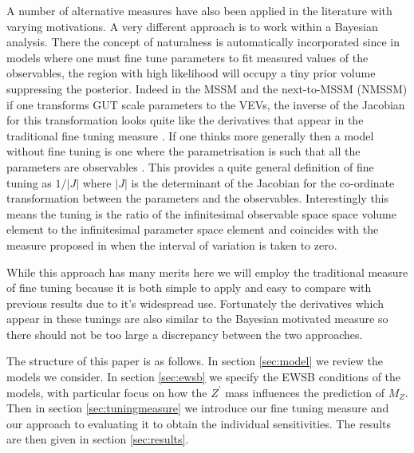 \documentclass[preprint,amsmath,amssymb,aps,superscriptaddress,prd,
showpacs,floatfix,nofootinbib]{revtex4-1}
\begin{document}
A number of alternative measures have also been applied in the
literature \cite{Anderson:1994dz, Anderson:1994tr, Anderson:1995cp,
Anderson:1996ew, Ciafaloni:1996zh, Chan:1997bi, Barbieri:1998uv,
Giusti:1998gz, Casas:2003jx, Casas:2004uu, Casas:2004gh,
Casas:2006bd, Kitano:2005wc, Athron:2007ry, Athron:2007qr,
Baer:2012up} with varying motivations.  A very different approach is
to work within a Bayesian analysis.  There the concept of naturalness
is automatically incorporated since in models where one must fine tune
parameters to fit measured values of the observables, the region with
high likelihood will occupy a tiny prior volume \cite{Allanach:2007qk,
Cabrera:2008tj, Ghilencea:2012gz, Ghilencea:2012qk, Fichet:2012sn,
Kim:2013uxa} suppressing the posterior.  Indeed in the MSSM and
the next-to-MSSM (NMSSM) if one transforms GUT scale parameters to the
VEVs, the inverse of the Jacobian for this transformation looks quite like
the derivatives that appear in the traditional fine tuning measure
\cite{Allanach:2007qk, Cabrera:2008tj, Kim:2013uxa}.  If one thinks
more generally then a model without fine tuning is one where the
parametrisation is such that all the parameters are observables
\cite{Fichet:2012sn, Kim:2013uxa}.  This provides a quite general
definition of fine tuning as $1/|J|$ where $|J|$ is the determinant of
the Jacobian for the co-ordinate transformation between the parameters
and the observables.  Interestingly this means the tuning is the ratio
of the infinitesimal observable space space volume element to the
infinitesimal parameter space element and coincides with the measure
proposed in \cite{Athron:2007ry} when the interval of variation is
taken to zero.

While this approach has many merits here we will employ the traditional
measure of fine tuning because it is both simple to apply and easy to
compare with previous results due to it's widespread use.  Fortunately
the derivatives which appear in these tunings are also similar to the
Bayesian motivated measure so there should not be too large a
discrepancy between the two approaches.

The structure of this paper is as follows.  In section \ref{sec:model}
we review the models we consider.  In section \ref{sec:ewsb} we
specify the EWSB conditions of the models, with particular focus on
how the $Z^\prime$ mass influences the prediction of $M_Z$.  Then in
section \ref{sec:tuningmeasure} we introduce our fine tuning measure
and our approach to evaluating it to obtain the individual
sensitivities.  The results are then given in section
\ref{sec:results}.
\end{document}
